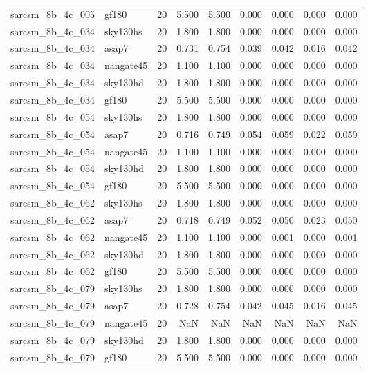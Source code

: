 \begin{tabular}{llrrrrrrr}
sarcsm\_8b\_4c\_005 & gf180 & 20 & 5.500 & 5.500 & 0.000 & 0.000 & 0.000 & 0.000 \\
sarcsm\_8b\_4c\_034 & sky130hs & 20 & 1.800 & 1.800 & 0.000 & 0.000 & 0.000 & 0.000 \\
sarcsm\_8b\_4c\_034 & asap7 & 20 & 0.731 & 0.754 & 0.039 & 0.042 & 0.016 & 0.042 \\
sarcsm\_8b\_4c\_034 & nangate45 & 20 & 1.100 & 1.100 & 0.000 & 0.000 & 0.000 & 0.000 \\
sarcsm\_8b\_4c\_034 & sky130hd & 20 & 1.800 & 1.800 & 0.000 & 0.000 & 0.000 & 0.000 \\
sarcsm\_8b\_4c\_034 & gf180 & 20 & 5.500 & 5.500 & 0.000 & 0.000 & 0.000 & 0.000 \\
sarcsm\_8b\_4c\_054 & sky130hs & 20 & 1.800 & 1.800 & 0.000 & 0.000 & 0.000 & 0.000 \\
sarcsm\_8b\_4c\_054 & asap7 & 20 & 0.716 & 0.749 & 0.054 & 0.059 & 0.022 & 0.059 \\
sarcsm\_8b\_4c\_054 & nangate45 & 20 & 1.100 & 1.100 & 0.000 & 0.000 & 0.000 & 0.000 \\
sarcsm\_8b\_4c\_054 & sky130hd & 20 & 1.800 & 1.800 & 0.000 & 0.000 & 0.000 & 0.000 \\
sarcsm\_8b\_4c\_054 & gf180 & 20 & 5.500 & 5.500 & 0.000 & 0.000 & 0.000 & 0.000 \\
sarcsm\_8b\_4c\_062 & sky130hs & 20 & 1.800 & 1.800 & 0.000 & 0.000 & 0.000 & 0.000 \\
sarcsm\_8b\_4c\_062 & asap7 & 20 & 0.718 & 0.749 & 0.052 & 0.050 & 0.023 & 0.050 \\
sarcsm\_8b\_4c\_062 & nangate45 & 20 & 1.100 & 1.100 & 0.000 & 0.001 & 0.000 & 0.001 \\
sarcsm\_8b\_4c\_062 & sky130hd & 20 & 1.800 & 1.800 & 0.000 & 0.000 & 0.000 & 0.000 \\
sarcsm\_8b\_4c\_062 & gf180 & 20 & 5.500 & 5.500 & 0.000 & 0.000 & 0.000 & 0.000 \\
sarcsm\_8b\_4c\_079 & sky130hs & 20 & 1.800 & 1.800 & 0.000 & 0.000 & 0.000 & 0.000 \\
sarcsm\_8b\_4c\_079 & asap7 & 20 & 0.728 & 0.754 & 0.042 & 0.045 & 0.016 & 0.045 \\
sarcsm\_8b\_4c\_079 & nangate45 & 20 & NaN & NaN & NaN & NaN & NaN & NaN \\
sarcsm\_8b\_4c\_079 & sky130hd & 20 & 1.800 & 1.800 & 0.000 & 0.000 & 0.000 & 0.000 \\
sarcsm\_8b\_4c\_079 & gf180 & 20 & 5.500 & 5.500 & 0.000 & 0.000 & 0.000 & 0.000 \\

\end{tabular}
